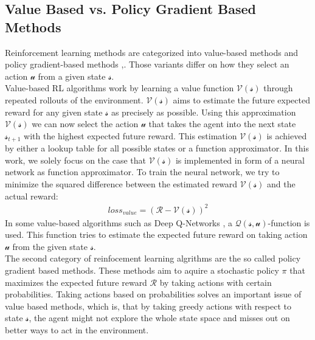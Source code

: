 \subsection*{Value Based vs. Policy Gradient Based Methods}\label{value_policy_based_methods}
Reinforcement learning methods are categorized into value-based methods and policy gradient-based methods \cite{tdlearning},\cite{policygradient}. Those variants differ on how they select an action $\mathcal{u}$ from a given state $\mathcal{s}$.\\
Value-based RL algorithms work by learning a value function $\mathcal{V(s)}$ through repeated rollouts of the environment. $\mathcal{V(s)}$ aims to estimate the future expected reward for any given state $\mathcal{s}$ as precisely as possible. Using this approximation $\mathcal{V(s)}$ we can now select the action $\mathcal{u}$ that takes the agent into the next state $\mathcal{s}_{t+1}$ with the highest expected future reward. This estimation $\mathcal{V(s)}$ is achieved by either a lookup table for all possible states or a function approximator. In this work, we solely focus on the case that $\mathcal{V(s)}$ is implemented in form of a neural network as function approximator. To train the neural network, we try to minimize the squared difference between the estimated reward $\mathcal{V(s)}$ and the actual reward:
\begin{gather*}
loss_{value}=(\mathcal{R}-\mathcal{V(s)})^2
\end{gather*}
In some value-based algorithms such as Deep Q-Networks \cite{mnih2013playing}, a $\mathcal{Q(s,u)}$-function is used. This function tries to estimate the expected future reward on taking action $\mathcal{u}$ from the given state $\mathcal{s}$.\\
The second category of reinfocement learning algrithms are the so called policy gradient based methods. These methods aim to aquire a stochastic policy $\pi$ that maximizes the expected future reward $\mathcal{R}$ by taking actions with certain probabilities. Taking actions based on probabilities solves an important issue of value based methods, which is, that by taking greedy actions with respect to state  $\mathcal{s}$, the agent might not explore the whole state space and misses out on better ways to act in the environment.

